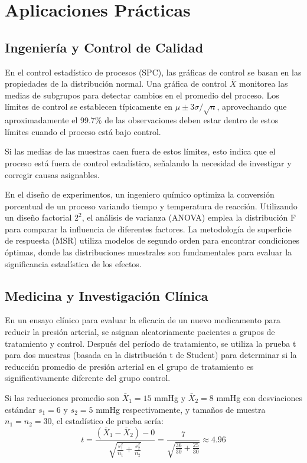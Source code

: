 \section{Aplicaciones Prácticas}

\subsection{Ingeniería y Control de Calidad}

\begin{example}
En el control estadístico de procesos (SPC), las gráficas de control se basan en las propiedades de la distribución normal. Una gráfica de control $\bar{X}$ monitorea las medias de subgrupos para detectar cambios en el promedio del proceso. Los límites de control se establecen típicamente en $\mu \pm 3\sigma/\sqrt{n}$, aprovechando que aproximadamente el 99.7\% de las observaciones deben estar dentro de estos límites cuando el proceso está bajo control.

Si las medias de las muestras caen fuera de estos límites, esto indica que el proceso está fuera de control estadístico, señalando la necesidad de investigar y corregir causas asignables.
\end{example}

\begin{example}
En el diseño de experimentos, un ingeniero químico optimiza la conversión porcentual de un proceso variando tiempo y temperatura de reacción. Utilizando un diseño factorial $2^2$, el análisis de varianza (ANOVA) emplea la distribución F para comparar la influencia de diferentes factores. La metodología de superficie de respuesta (MSR) utiliza modelos de segundo orden para encontrar condiciones óptimas, donde las distribuciones muestrales son fundamentales para evaluar la significancia estadística de los efectos.
\end{example}

\subsection{Medicina y Investigación Clínica}

\begin{example}
En un ensayo clínico para evaluar la eficacia de un nuevo medicamento para reducir la presión arterial, se asignan aleatoriamente pacientes a grupos de tratamiento y control. Después del período de tratamiento, se utiliza la prueba t para dos muestras (basada en la distribución t de Student) para determinar si la reducción promedio de presión arterial en el grupo de tratamiento es significativamente diferente del grupo control.

Si las reducciones promedio son $\bar{X}_1 = 15$ mmHg y $\bar{X}_2 = 8$ mmHg con desviaciones estándar $s_1 = 6$ y $s_2 = 5$ mmHg respectivamente, y tamaños de muestra $n_1 = n_2 = 30$, el estadístico de prueba sería:
\begin{equation}
t = \frac{(\bar{X}_1 - \bar{X}_2) - 0}{\sqrt{\frac{s_1^2}{n_1} + \frac{s_2^2}{n_2}}} = \frac{7}{\sqrt{\frac{36}{30} + \frac{25}{30}}} \approx 4.96
\end{equation}
\end{example}

